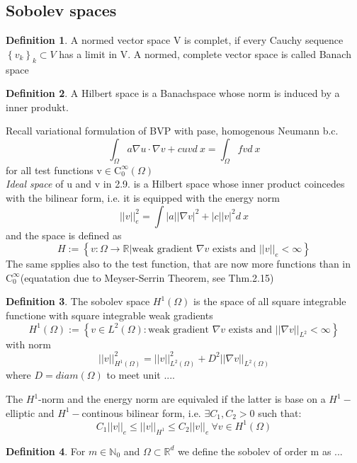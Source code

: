 \documentclass[ngerman]{article}
\theoremstyle{definition}
\newtheorem*{defi}{Definition}
\theoremstyle{remark}
\newcommand{\NN}{\mathbb{N}}			%
\newcommand{\RR}{\mathbb{R}}			%
\newcommand{\OO}{\Omega}
\newcommand{\cinf}{\tx{C}^\infty}
\newcommand{\tri}{\nabla}
\newcommand{\tx}[1]{\text{#1}}
\begin{document}
  \subsection{Sobolev spaces}
  \begin{defi}
    A normed vector space V is complet, if every Cauchy sequence $\left\{ v_k \right\}_k \subset V$ has a limit in V. A normed, complete vector space is called Banach space\end{defi}
  \begin{defi}
    A Hilbert space is a Banachspace whose norm is induced by a inner produkt.\end{defi}
  Recall variational formulation of BVP with pase, homogenous Neumann b.c.
  $$\int_\OO a \tri u \cdot \tri v + cuv d\ x = \int_\OO fv d\ x$$
  for all test functions v$\in \cinf _0(\OO)$\\
  \emph{Ideal space} of u and v in 2.9. is a Hilbert space whose inner product coincedes with the bilinear form, i.e. it is equipped with the energy norm
  $$||v||_e ^2 = \int |a||\tri v |^2 +|c||v|^2 d\ x $$
  and the space is defined as 
  $$ H:= \left\{v : \OO \to \RR | \tx{weak gradient }\tri v \tx{ exists and } ||v||_e <\infty \right\}$$
  The same spplies also to the test function, that are now more functions than in $\cinf_0$(equatation due to Meyser-Serrin Theorem, see Thm.2.15)
  \begin{defi}
    The sobolev space $H^1(\OO)$ is the space of all square integrable functione with square integrable weak gradients
    $$H^1(\OO) := \left\{v\in L^2(\OO) : \tx{weak gradient }\tri v \tx{ exists and } ||\tri v||_{L^2} <\infty \right\}$$
    with norm $$||v||^2 _{H^1(\OO)} = ||v||^2 _{L^2(\OO)} + D^2 ||\tri v||_{L^2(\OO)}$$
    where $D= diam (\OO)$ to meet unit ....


    The $H^1$-norm and the energy norm are equivaled if the latter is base on a $H^1-$elliptic and $H^1-$continous bilinear form, i.e. $\exists C_1,C_2>0$ such that:
    $$C_1 ||v||_e \leq ||v||_{H^1 }\leq C_2||v||_e \ \forall v \in H^1(\OO)$$
  \end{defi}
  \begin{defi} For $m \in \NN_0$ and $\OO\subset \RR^d$ we define the sobolev of order m as ...
  \end{defi}
\end{document}
